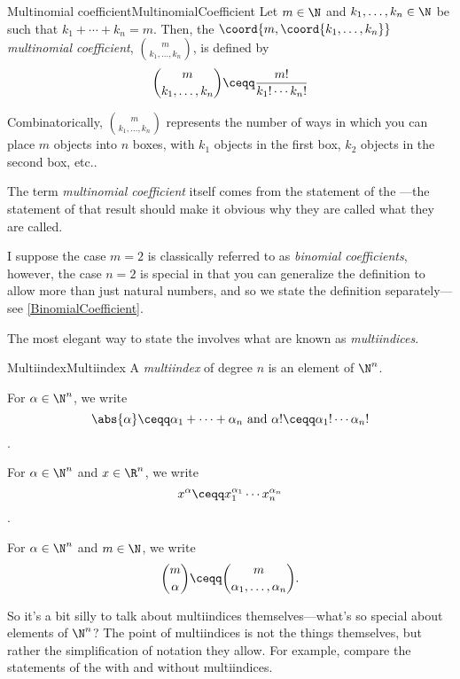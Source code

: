 \begin{dfn}{Multinomial coefficient}{MultinomialCoefficient}
Let $m\in \N$ and $k_1,\ldots ,k_n\in \N$ be such that $k_1+\cdots +k_n=m$.  Then, the \emph{$\coord{m,\coord{k_1,\ldots ,k_n}}$ multinomial coefficient}, $\binom{m}{k_1,\ldots ,k_n}$, is defined by
\begin{equation}\label{eqn6.4.110}
\binom{m}{k_1,\ldots ,k_n}\ceqq \frac{m!}{k_1!\cdots k_n!}
\end{equation}
\begin{rmk}
Combinatorically, $\binom{m}{k_1,\ldots ,k_n}$ represents the number of ways in which you can place $m$ objects into $n$ boxes, with $k_1$ objects in the first box, $k_2$ objects in the second box, etc..
\end{rmk}
\begin{rmk}
The term \emph{multinomial coefficient} itself comes from the statement of the ---the statement of that result should make it obvious why they are called what they are called.
\end{rmk}
\begin{rmk}
I suppose the case $m=2$ is classically referred to as \emph{binomial coefficients}, however, the case $n=2$ is special in that you can generalize the definition to allow more than just natural numbers, and so we state the definition separately---see \cref{BinomialCoefficient}.
\end{rmk}
\end{dfn}
The most elegant way to state the  involves what are known as \emph{multiindices}.
\begin{dfn}{Multiindex}{Multiindex}
A \emph{multiindex} of degree $n$ is an element of $\N ^n$.

For $\alpha \in \N ^n$, we write
\begin{equation}
\abs{\alpha}\ceqq \alpha _1+\cdots +\alpha _n\text{ and }\alpha !\ceqq \alpha _1!\cdots \alpha _n!
\end{equation}\index[notation]{$\abs{\alpha}$}.

For $\alpha \in \N ^n$ and $x\in \R ^n$, we write
\begin{equation}
x^\alpha \ceqq x_1^{\alpha _1}\cdots x_n^{\alpha _n}
\end{equation}.

For $\alpha \in \N ^n$ and $m\in \N$, we write
\begin{equation}
\binom{m}{\alpha}\ceqq \binom{m}{\alpha _1,\ldots ,\alpha _n}.
\end{equation}
\begin{rmk}
So it's a bit silly to talk about multiindices themselves---what's so special about elements of $\N ^n$?  The point of multiindices is not the things themselves, but rather the simplification of notation they allow.  For example, compare the statements of the  with and without multiindices.
\end{rmk}
\end{dfn}
